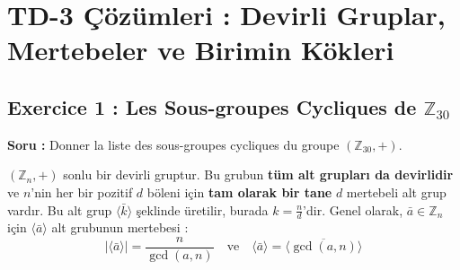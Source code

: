 \documentclass[12pt,a4paper]{report}
\begin{document}
\newpage
\section{TD-3 Çözümleri : Devirli Gruplar, Mertebeler ve Birimin Kökleri}

\subsection*{Exercice 1 : Les Sous-groupes Cycliques de $\mathbb{Z}_{30}$}
\textbf{Soru :} Donner la liste des sous-groupes cycliques du groupe $(\mathbb{Z}_{30}, +)$.

\begin{tcolorbox}[colback=blue!5!white,colframe=blue!75!black,title=Teorik Altyapı : $\mathbb{Z}_n$'nin Alt Grupları Teoremi]
$(\mathbb{Z}_n, +)$ sonlu bir devirli gruptur. Bu grubun \textbf{tüm alt grupları da devirlidir} ve $n$'nin her bir pozitif $d$ böleni için \textbf{tam olarak bir tane} $d$ mertebeli alt grup vardır.
Bu alt grup $\langle \bar{k} \rangle$ şeklinde üretilir, burada $k = \frac{n}{d}$'dir.
Genel olarak, $\bar{a} \in \mathbb{Z}_n$ için $\langle \bar{a} \rangle$ alt grubunun mertebesi :
\[ |\langle \bar{a} \rangle| = \frac{n}{\gcd(a, n)} \quad \text{ve} \quad \langle \bar{a} \rangle = \langle \overline{\gcd(a, n)} \rangle \]
\end{tcolorbox}
\end{document}
